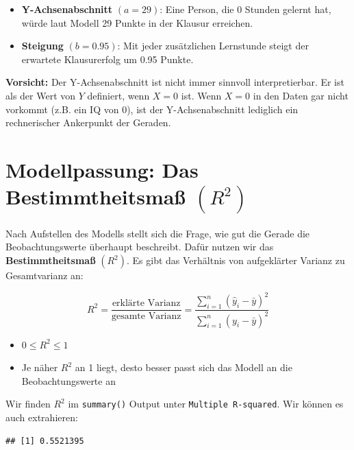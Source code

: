 \documentclass[
]{book}
\newenvironment{Shaded}{\begin{snugshade}}{\end{snugshade}}
\newcommand{\FunctionTok}[1]{\textcolor[rgb]{0.13,0.29,0.53}{\textbf{#1}}}
\newcommand{\NormalTok}[1]{#1}
\newcommand{\SpecialCharTok}[1]{\textcolor[rgb]{0.81,0.36,0.00}{\textbf{#1}}}
\providecommand{\tightlist}{%
  \setlength{\itemsep}{0pt}\setlength{\parskip}{0pt}}
\begin{document}
\begin{itemize}
\tightlist
\item
  \textbf{Y-Achsenabschnitt} \((a=29)\): Eine Person, die 0 Stunden gelernt hat, würde laut Modell 29 Punkte in der Klausur erreichen.
\item
  \textbf{Steigung} \((b=0.95)\): Mit jeder zusätzlichen Lernstunde steigt der erwartete Klausurerfolg um 0.95 Punkte.
\end{itemize}

\textbf{Vorsicht:} Der Y-Achsenabschnitt ist nicht immer sinnvoll interpretierbar. Er ist als der Wert von \(Y\) definiert, wenn \(X=0\) ist. Wenn \(X=0\) in den Daten gar nicht vorkommt (z.B. ein IQ von 0), ist der Y-Achsenabschnitt lediglich ein rechnerischer Ankerpunkt der Geraden.

\section{\texorpdfstring{Modellpassung: Das Bestimmtheitsmaß \((R^2)\)}{Modellpassung: Das Bestimmtheitsmaß (R\^{}2)}}\label{modellpassung-das-bestimmtheitsmauxdf-r2}

Nach Aufstellen des Modells stellt sich die Frage, wie gut die Gerade die Beobachtungswerte überhaupt beschreibt. Dafür nutzen wir das \textbf{Bestimmtheitsmaß} \((R^2)\). Es gibt das Verhältnis von aufgeklärter Varianz zu Gesamtvarianz an:

\[R^2=\frac{\text{erklärte Varianz}}{\text{gesamte Varianz}}=\frac{\sum\limits _{i=1}^{n}(\hat{y}_i-\bar{y})^2}{\sum\limits _{i=1}^{n}(y_i-\bar{y})^2}\]

\begin{itemize}
\tightlist
\item
  \(0 \leq R^2 \leq 1\)
\item
  Je näher \(R^2\) an 1 liegt, desto besser passt sich das Modell an die Beobachtungswerte an
\end{itemize}

Wir finden \(R^2\) im \texttt{summary()} Output unter \texttt{Multiple\ R-squared}. Wir können es auch extrahieren:

\begin{Shaded}
\end{Shaded}

\begin{verbatim}
## [1] 0.5521395
\end{verbatim}
\end{document}
